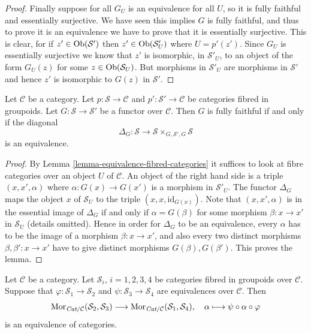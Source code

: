 \begin{proof}
\medskip\noindent
Finally suppose for all $G_U$ is an equivalence for all $U$, so it is
fully faithful and essentially surjective. We have seen this implies $G$ is
fully faithful, and thus to prove it is an equivalence we have to prove that
it is essentially surjective. This is clear, for if $z'\in
\mathop{\mathrm{Ob}}\nolimits(\mathcal{S}')$ then $z'\in \mathop{\mathrm{Ob}}\nolimits(\mathcal{S}'_U)$ where
$U = p'(z')$. Since $G_U$ is essentially surjective we know that
$z'$ is isomorphic, in $\mathcal{S}'_U$, to an object of the form
$G_U(z)$ for some $z\in \mathop{\mathrm{Ob}}\nolimits(\mathcal{S}_U)$. But morphisms
in $\mathcal{S}'_U$ are morphisms in $\mathcal{S}'$ and hence $z'$ is
isomorphic to $G(z)$ in $\mathcal{S}'$.
\end{proof}

\begin{lemma}
\label{lemma-fully-faithful-diagonal-equivalence}
Let $\mathcal{C}$ be a category. Let $p : \mathcal{S}\to \mathcal{C}$ and
$p' : \mathcal{S'}\to \mathcal{C}$ be categories fibred in groupoids.
Let $G : \mathcal{S}\to \mathcal {S}'$ be a functor over $\mathcal{C}$.
Then $G$ is fully faithful if and only if the diagonal
$$
\Delta_G :
\mathcal{S}
\longrightarrow
\mathcal{S} \times_{G, \mathcal{S}', G} \mathcal{S}
$$
is an equivalence.
\end{lemma}

\begin{proof}
By
Lemma \ref{lemma-equivalence-fibred-categories}
it suffices to look at fibre categories over an object $U$ of $\mathcal{C}$.
An object of the right hand side is a triple $(x, x', \alpha)$ where
$\alpha : G(x) \to G(x')$ is a morphism in $\mathcal{S}'_U$.
The functor $\Delta_G$ maps the object $x$ of $\mathcal{S}_U$
to the triple $(x, x, \text{id}_{G(x)})$. Note that $(x, x', \alpha)$
is in the essential image of $\Delta_G$ if and only if $\alpha = G(\beta)$
for some morphism $\beta : x \to x'$ in $\mathcal{S}_U$ (details omitted).
Hence in order for $\Delta_G$ to be an equivalence, every $\alpha$ has to
be the image of a morphism $\beta : x \to x'$, and also every two
distinct morphisms $\beta, \beta' : x \to x'$ have to give distinct
morphisms $G(\beta), G(\beta')$. This proves the lemma.
\end{proof}

\begin{lemma}
\label{lemma-morphisms-equivalent-fibred-groupoids}
Let $\mathcal{C}$ be a category.
Let $\mathcal{S}_i$, $i = 1, 2, 3, 4$ be categories fibred in
groupoids over $\mathcal{C}$.
Suppose that $\varphi : \mathcal{S}_1 \to \mathcal{S}_2$ and
$\psi : \mathcal{S}_3 \to \mathcal{S}_4$ are equivalences
over $\mathcal{C}$. Then
$$
\mathop{\mathrm{Mor}}\nolimits_{\textit{Cat}/\mathcal{C}}(\mathcal{S}_2, \mathcal{S}_3)
\longrightarrow
\mathop{\mathrm{Mor}}\nolimits_{\textit{Cat}/\mathcal{C}}(\mathcal{S}_1, \mathcal{S}_4),
\quad \alpha \longmapsto \psi \circ \alpha \circ \varphi
$$
is an equivalence of categories.
\end{lemma}

